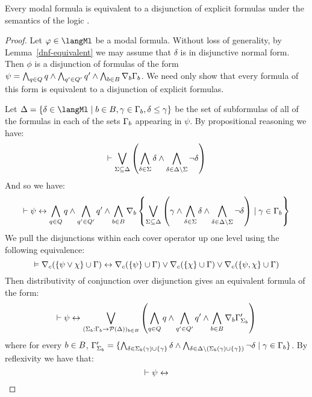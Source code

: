 \begin{lemma}
Every modal formula is equivalent to a disjunction of explicit formulas under the semantics of the logic \logicS{}.
\end{lemma}

\begin{proof}
Let $\phi \in \langMl$ be a modal formula.
Without loss of generality, by Lemma~\ref{dnf-equivalent} we may assume that $\delta$ is in disjunctive normal form.
Then $\phi$ is a disjunction of formulas of the form $\psi = \bigwedge_{q \in Q} q \land \bigwedge_{q' \in Q'} q' \land \bigwedge_{b \in B} \nabla_{b} \Gamma_b$.
We need only show that every formula of this form is equivalent to a disjunction of explicit formulas.

Let $\Delta = \{\delta \in \langMl \mid \agentB \in \agentsB, \gamma \in \Gamma_\agentB, \delta \leq \gamma\}$ be the set of subformulas of all of the formulas in each of the sets $\Gamma_b$ appearing in $\psi$.
By propositional reasoning we have:
$$
\vdash \bigvee_{\Sigma \subseteq \Delta} \left( \bigwedge_{\delta \in \Sigma} \delta \land \bigwedge_{\delta \in \Delta \setminus \Sigma} \neg \delta \right) 
$$
And so we have:
$$
\vdash \psi \leftrightarrow \bigwedge_{q \in Q} q \land \bigwedge_{q' \in Q'} q' \land \bigwedge_{b \in B} \nabla_{b} \left\{ \bigvee_{\Sigma \subseteq \Delta} \left( \gamma \land \bigwedge_{\delta \in \Sigma} \delta \land \bigwedge_{\delta \in \Delta \setminus \Sigma} \neg \delta \right) \mid \gamma \in \Gamma_b \right\}
$$
We pull the disjunctions within each cover operator up one level using the following equivalence:
$$
\vDash \nabla_{c} (\{\psi \lor \chi\} \cup \Gamma) \leftrightarrow \nabla_{c} (\{\psi\} \cup \Gamma) \lor \nabla_{c} (\{\chi\} \cup \Gamma) \lor \nabla_{c} (\{\psi, \chi\} \cup \Gamma)
$$
Then distributivity of conjunction over disjunction gives an equivalent formula of the form:
$$
\vdash \psi \leftrightarrow
\bigvee_{(\Sigma_b : \Gamma_b \to \mathcal{P}(\Delta))_{b \in B}} \left( \bigwedge_{q \in Q} q \land \bigwedge_{q' \in Q'} q' \land \bigwedge_{b \in B} \nabla_{b} \Gamma'_{\Sigma_b} \right)
$$
where for every $b \in B$, $\Gamma'_{\Sigma_b} = \{\bigwedge_{\delta \in \Sigma_b(\gamma) \cup \{\gamma\}} \delta \land \bigwedge_{\delta \in \Delta \setminus (\Sigma_b(\gamma) \cup \{\gamma\})} \neg \delta \mid \gamma \in \Gamma_b\}$.
By reflexivity we have that:
$$
\vdash \psi \leftrightarrow
$$
\end{proof}
